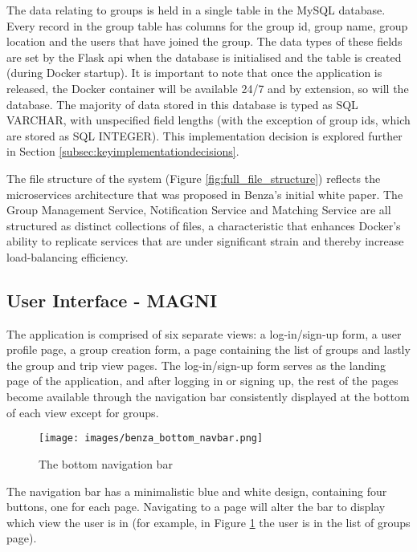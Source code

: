 \documentclass{article}
\begin{document}
    The data relating to groups is held in a single table in the MySQL database. Every record in the group table has columns for the group \acrshort{id}, group name, group location and the users that have joined the group. The data types of these fields are set by the Flask \acrshort{api} when the database is initialised and the table is created (during Docker startup). It is important to note that once the application is released, the Docker container will be available 24/7 and by extension, so will the database. The majority of data stored in this database is typed as SQL VARCHAR, with unspecified field lengths (with the exception of group \acrshort{id}s, which are stored as SQL INTEGER). This implementation decision is explored further in Section \ref{subsec:keyimplementationdecisions}. \par
    
    The file structure of the system (Figure \ref{fig:full_file_structure}) reflects the microservices architecture that was proposed in Benza's initial white paper. The Group Management Service, Notification Service and Matching Service are all structured as distinct collections of files, a characteristic that enhances Docker's ability to replicate services that are under significant strain and thereby increase load-balancing efficiency. \par
    
    
    \subsection{User Interface - MAGNI}
    The application is comprised of six separate views: a log-in/sign-up form, a user profile page, a group creation form, a page containing the list of groups and lastly the group and trip view pages. The log-in/sign-up form serves as the landing page of the application, and after logging in or signing up, the rest of the pages become available through the navigation bar consistently displayed at the bottom of each view except for groups. \par 
    
    \begin{figure}
        \centering
        \texttt{[image: images/benza\_bottom\_navbar.png]}
        \caption{The bottom navigation bar}
        \label{fig:benza_bottom_navbar}
    \end{figure}
    
    The navigation bar has a minimalistic blue and white design, containing four buttons, one for each page. Navigating to a page will alter the bar to display which view the user is in (for example, in Figure \ref{fig:benza_bottom_navbar} the user is in the list of groups page). \par
    
\end{document}
